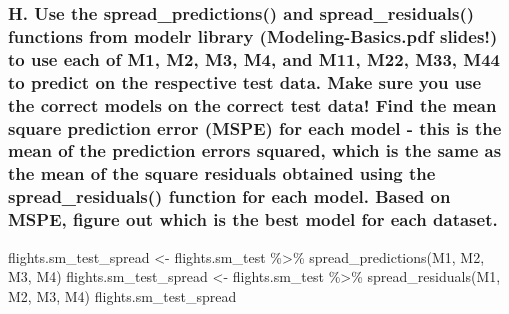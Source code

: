 \documentclass[
]{article}
\newenvironment{Shaded}{\begin{snugshade}}{\end{snugshade}}
\newcommand{\FunctionTok}[1]{\textcolor[rgb]{0.00,0.00,0.00}{#1}}
\newcommand{\NormalTok}[1]{#1}
\newcommand{\OtherTok}[1]{\textcolor[rgb]{0.56,0.35,0.01}{#1}}
\newcommand{\SpecialCharTok}[1]{\textcolor[rgb]{0.00,0.00,0.00}{#1}}
\begin{document}
\hypertarget{h.-use-the-spread_predictions-and-spread_residuals-functions-from-modelr-library-modeling-basics.pdf-slides-to-use-each-of-m1-m2-m3-m4-and-m11-m22-m33-m44-to-predict-on-the-respective-test-data.-make-sure-you-use-the-correct-models-on-the-correct-test-data-find-the-mean-square-prediction-error-mspe-for-each-model---this-is-the-mean-of-the-prediction-errors-squared-which-is-the-same-as-the-mean-of-the-square-residuals-obtained-using-the-spread_residuals-function-for-each-model.-based-on-mspe-figure-out-which-is-the-best-model-for-each-dataset.}{%
\subsubsection{H. Use the spread\_predictions() and spread\_residuals()
functions from modelr library (Modeling-Basics.pdf slides!) to use each
of M1, M2, M3, M4, and M11, M22, M33, M44 to predict on the respective
test data. Make sure you use the correct models on the correct test
data! Find the mean square prediction error (MSPE) for each model - this
is the mean of the prediction errors squared, which is the same as the
mean of the square residuals obtained using the spread\_residuals()
function for each model. Based on MSPE, figure out which is the best
model for each
dataset.}\label{h.-use-the-spread_predictions-and-spread_residuals-functions-from-modelr-library-modeling-basics.pdf-slides-to-use-each-of-m1-m2-m3-m4-and-m11-m22-m33-m44-to-predict-on-the-respective-test-data.-make-sure-you-use-the-correct-models-on-the-correct-test-data-find-the-mean-square-prediction-error-mspe-for-each-model---this-is-the-mean-of-the-prediction-errors-squared-which-is-the-same-as-the-mean-of-the-square-residuals-obtained-using-the-spread_residuals-function-for-each-model.-based-on-mspe-figure-out-which-is-the-best-model-for-each-dataset.}}

\begin{Shaded}
\begin{Highlighting}[]
\NormalTok{flights.sm\_test\_spread }\OtherTok{\textless{}{-}}\NormalTok{ flights.sm\_test }\SpecialCharTok{\%\textgreater{}\%}
    \FunctionTok{spread\_predictions}\NormalTok{(M1, M2, M3, M4)}
\NormalTok{flights.sm\_test\_spread }\OtherTok{\textless{}{-}}\NormalTok{ flights.sm\_test }\SpecialCharTok{\%\textgreater{}\%}
    \FunctionTok{spread\_residuals}\NormalTok{(M1, M2, M3, M4)}
\NormalTok{flights.sm\_test\_spread}
\end{Highlighting}
\end{Shaded}
\end{document}
